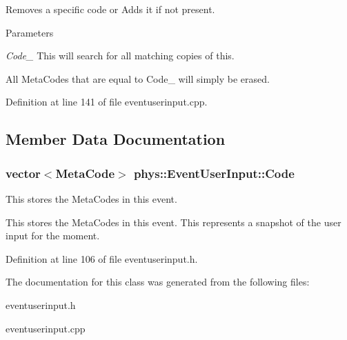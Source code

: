 Removes a specific code or Adds it if not present. 


\begin{DoxyParams}{Parameters}
\item[{\em Code\_\-}]This will search for all matching copies of this.\end{DoxyParams}
All MetaCodes that are equal to Code\_\- will simply be erased. 

Definition at line 141 of file eventuserinput.cpp.



\subsection{Member Data Documentation}
\hypertarget{classphys_1_1EventUserInput_aee3dc1d8cac82482651487c48c6c60c9}{
\subsubsection[{Code}]{\setlength{\rightskip}{0pt plus 5cm}vector$<${\bf MetaCode}$>$ {\bf phys::EventUserInput::Code}}}
\label{d7/df5/classphys_1_1EventUserInput_aee3dc1d8cac82482651487c48c6c60c9}


This stores the MetaCodes in this event. 

This stores the MetaCodes in this event. This represents a snapshot of the user input for the moment. 

Definition at line 106 of file eventuserinput.h.



The documentation for this class was generated from the following files:\begin{DoxyCompactItemize}
\item 
eventuserinput.h\item 
eventuserinput.cpp\end{DoxyCompactItemize}
